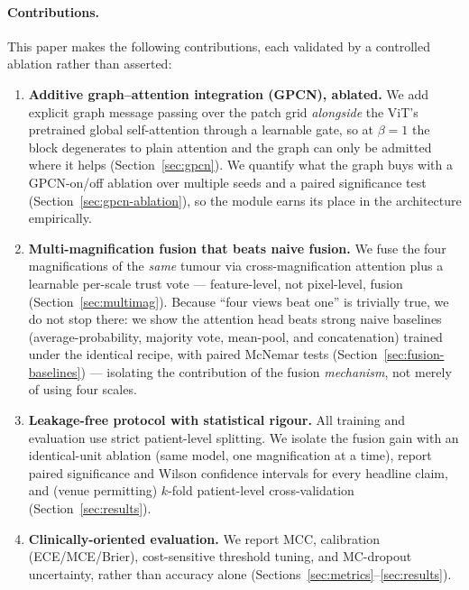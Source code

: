 \documentclass[11pt]{article}
\begin{document}
\paragraph{Contributions.} This paper makes the following contributions, each
validated by a controlled ablation rather than asserted:
\begin{enumerate}
  \item \textbf{Additive graph--attention integration (GPCN), ablated.} We add
    explicit graph message passing over the patch grid \emph{alongside} the ViT's
    pretrained global self-attention through a learnable gate, so at $\beta=1$ the
    block degenerates to plain attention and the graph can only be admitted where
    it helps (Section~\ref{sec:gpcn}). We quantify what the graph buys with a
    GPCN-on/off ablation over multiple seeds and a paired significance test
    (Section~\ref{sec:gpcn-ablation}), so the module earns its place in the
    architecture empirically.
  \item \textbf{Multi-magnification fusion that beats naive fusion.} We fuse the
    four magnifications of the \emph{same} tumour via cross-magnification attention
    plus a learnable per-scale trust vote — feature-level, not pixel-level, fusion
    (Section~\ref{sec:multimag}). Because ``four views beat one'' is trivially
    true, we do not stop there: we show the attention head beats strong naive
    baselines (average-probability, majority vote, mean-pool, and concatenation)
    trained under the identical recipe, with paired McNemar tests
    (Section~\ref{sec:fusion-baselines}) — isolating the contribution of the
    fusion \emph{mechanism}, not merely of using four scales.
  \item \textbf{Leakage-free protocol with statistical rigour.} All training and
    evaluation use strict patient-level splitting. We isolate the fusion gain with
    an identical-unit ablation (same model, one magnification at a time), report
    paired significance and Wilson confidence intervals for every headline claim,
    and (venue permitting) $k$-fold patient-level cross-validation
    (Section~\ref{sec:results}).
  \item \textbf{Clinically-oriented evaluation.} We report MCC, calibration
    (ECE/MCE/Brier), cost-sensitive threshold tuning, and MC-dropout uncertainty,
    rather than accuracy alone (Sections~\ref{sec:metrics}--\ref{sec:results}).
\end{enumerate}

\end{document}
